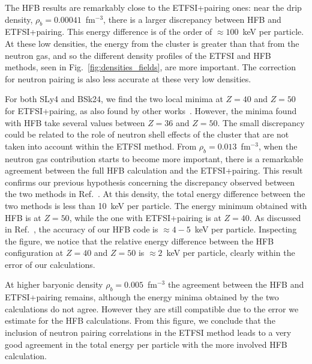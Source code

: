 \documentclass[
    amsmath,amssymb,
    aps,
    prc,
    floatfix,
]{revtex4-2}
\begin{document}
The HFB results are remarkably close to the ETFSI+pairing ones: near the drip density, $\rho_b=0.00041$~fm$^{-3}$, there is a larger discrepancy between HFB and ETFSI+pairing. This energy difference is of the order of $\approx100$~keV per particle. At these low densities, the energy from the cluster is greater than that from the neutron gas, and so the different density profiles of the ETFSI and HFB methods, seen in Fig.~\ref{fig:densities_fields}, are more important. The correction for neutron pairing is also less accurate at these very low densities.

For both SLy4 and BSk24, we find the two local minima at $Z=40$ and $Z=50$ for ETFSI+pairing, as also found by other works~\cite{pearsonInnerCrustNeutron2012,pearson2015role,pearsonUnifiedEquationsState2018,pearsonErratumUnifiedEquations2019}. However, the minima found with HFB take several values between $Z=36$ and $Z=50$. 
The small discrepancy could be related to the role of neutron shell effects of the cluster that are not taken into account within the ETFSI method. From $\rho_b=0.013$~fm$^{-3}$, when the neutron gas contribution starts to become more important, there is a remarkable agreement between the full HFB calculation and the ETFSI+pairing. This result confirms our previous hypothesis concerning the discrepancy observed between the two methods in Ref.~\cite{shelley2020accurately}.
At this density, the total energy difference between the two methods is less than 10~keV per particle. The energy minimum obtained with HFB is at $Z=50$, while the one with ETFSI+pairing is at $Z=40$. As discussed in Ref.~\cite{pastore2017new}, the accuracy of our HFB code is $\approx4-5$~keV per particle. Inspecting the figure, we notice that the relative energy difference between the HFB configuration at $Z=40$ and $Z=50$ is $\approx2$~keV per particle, clearly within the error of our calculations.

At higher baryonic density $\rho_b=0.005$~fm$^{-3}$ the agreement between the HFB and ETFSI+pairing remains, although the energy minima obtained by the two calculations do not agree. However they are still compatible due to the error we estimate for the HFB calculations. From this figure, we conclude that the inclusion of neutron pairing correlations in the ETFSI method leads to a very good agreement in the total energy per particle with the more involved HFB calculation.

\end{document}
